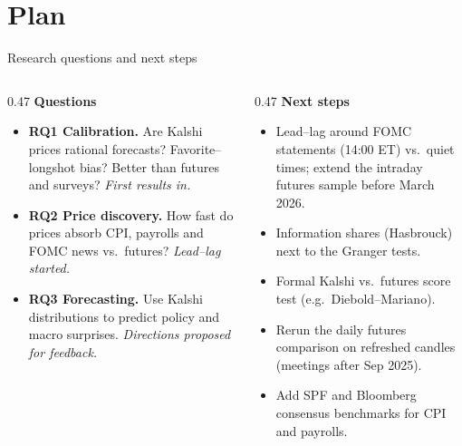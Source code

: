 \documentclass[aspectratio=169, 11pt, t]{beamer}
\begin{document}
\sloanappendix
{}

\section{Plan}
\begin{frame}{Research questions and next steps}
  \begin{columns}[T]
    \begin{column}{0.47\textwidth}
      {\color{sloanred}\bfseries\small Questions}\par\vspace{4pt}
      \begin{itemize}\footnotesize
        \item \textbf{RQ1 Calibration.} Are Kalshi prices rational forecasts? Favorite--longshot bias? Better than futures and surveys? \emph{First results in.}
        \item \textbf{RQ2 Price discovery.} How fast do prices absorb CPI, payrolls and FOMC news vs.\ futures? \emph{Lead--lag started.}
        \item \textbf{RQ3 Forecasting.} Use Kalshi distributions to predict policy and macro surprises. \emph{Directions proposed for feedback.}
      \end{itemize}
    \end{column}
    \begin{column}{0.47\textwidth}
      {\color{sloanred}\bfseries\small Next steps}\par\vspace{4pt}
      \begin{itemize}\footnotesize
        \item Lead--lag around FOMC statements (14:00 ET) vs.\ quiet times; extend the intraday futures sample before March 2026.
        \item Information shares (Hasbrouck) next to the Granger tests.
        \item Formal Kalshi vs.\ futures score test (e.g.\ Diebold--Mariano).
        \item Rerun the daily futures comparison on refreshed candles (meetings after Sep 2025).
        \item Add SPF and Bloomberg consensus benchmarks for CPI and payrolls.
      \end{itemize}
    \end{column}
  \end{columns}
\end{frame}
\end{document}
